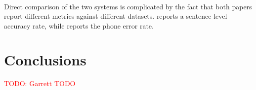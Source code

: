 \documentclass[letterpaper]{article}
\newcommand{\TODO}[1]{\textcolor{red}{TODO: #1}}
\begin{document}
\paragraph{} Direct comparison of the two systems is complicated by the fact that both papers report different metrics against different datasets. \cite{DBLP:journals/taslp/DahlYDA12} reports a sentence level accuracy rate, while \cite{DBLP:journals/taslp/Abdel-HamidMJDPY14} reports the phone error rate.

\section*{Conclusions} \TODO{Garrett TODO}

\appendix

\singlespacing



\end{document}
